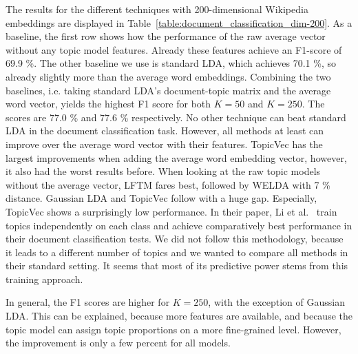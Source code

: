 \documentclass[
        a4paper,
        titlepage,
        twoside,
        parskip
        ]{scrbook}
\theoremstyle{break}
\begin{document}
The results for the different techniques with 200-dimensional Wikipedia embeddings are displayed in Table~\ref{table:document_classification_dim-200}.
As a baseline, the first row shows how the performance of the raw average vector without any topic model features.
Already these features achieve an F1-score of 69.9 \%.
The other baseline we use is standard LDA, which achieves 70.1 \%, so already slightly more than the average word embeddings.
Combining the two baselines, i.e. taking standard LDA's document-topic matrix and the average word vector, yields the highest F1 score for both $K = 50$ and $K = 250$.
The scores are 77.0 \% and 77.6 \% respectively.
No other technique can beat standard LDA in the document classification task.
However, all methods at least can improve over the average word vector with their features.
TopicVec has the largest improvements when adding the average word embedding vector, however, it also had the worst results before.
When looking at the raw topic models without the average vector, LFTM fares best, followed by WELDA with 7 \% distance.
Gaussian LDA and TopicVec follow with a huge gap.
Especially, TopicVec shows a surprisingly low performance.
In their paper,  Li et al.~\cite{Li2016} train topics independently on each class and achieve comparatively best performance in their document classification tests.
We did not follow this methodology, because it leads to a different number of topics and we wanted to compare all methods in their standard setting.
It seems that most of its predictive power stems from this training approach.

In general, the F1 scores are higher for $K = 250$, with the exception of Gaussian LDA.
This can be explained, because more features are available, and because the topic model can assign topic proportions on a more fine-grained level.
However, the improvement is only a few percent for all models.
\end{document}
